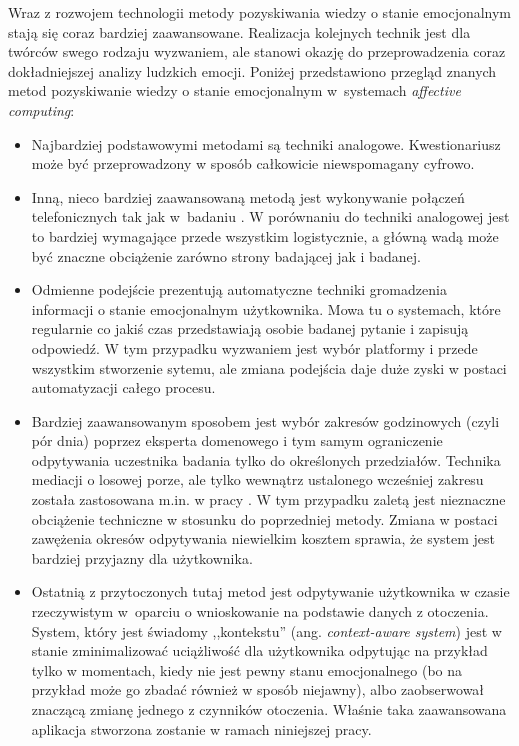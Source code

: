 Wraz z rozwojem technologii metody pozyskiwania wiedzy o stanie emocjonalnym stają się coraz bardziej zaawansowane. Realizacja kolejnych technik jest dla twórców swego rodzaju wyzwaniem, ale stanowi okazję do przeprowadzenia coraz dokładniejszej analizy ludzkich emocji. Poniżej przedstawiono przegląd znanych metod pozyskiwanie wiedzy o stanie emocjonalnym w~systemach \textit{affective computing}:

\begin{itemize}	
	\item Najbardziej podstawowymi metodami są techniki analogowe. Kwestionariusz może być przeprowadzony w sposób całkowicie niewspomagany cyfrowo.
	
	\item Inną, nieco bardziej zaawansowaną metodą jest wykonywanie połączeń telefonicznych tak jak w~badaniu \cite{courvoisier2010psychometric}. W porównaniu do techniki analogowej jest to bardziej wymagające przede wszystkim logistycznie, a główną wadą może być znaczne obciążenie zarówno strony badającej jak i badanej.
	
	\item Odmienne podejście prezentują automatyczne techniki gromadzenia informacji o stanie emocjonalnym użytkownika. Mowa tu o systemach, które regularnie co jakiś czas przedstawiają osobie badanej pytanie i zapisują odpowiedź. W tym przypadku wyzwaniem jest wybór platformy i przede wszystkim stworzenie sytemu, ale zmiana podejścia daje duże zyski w postaci automatyzacji całego procesu.
	
	\item Bardziej zaawansowanym sposobem jest wybór zakresów godzinowych (czyli pór dnia) poprzez eksperta domenowego i tym samym ograniczenie odpytywania uczestnika badania tylko do określonych przedziałów. Technika mediacji o losowej porze, ale tylko wewnątrz ustalonego wcześniej zakresu została zastosowana m.in. w pracy \cite{bailon2019smartphone}. W tym przypadku zaletą jest nieznaczne obciążenie techniczne w stosunku do poprzedniej metody. Zmiana w postaci zawężenia okresów odpytywania niewielkim kosztem sprawia, że system jest bardziej przyjazny dla użytkownika.
	
	\item Ostatnią z przytoczonych tutaj metod jest odpytywanie użytkownika w czasie rzeczywistym w~oparciu o wnioskowanie na podstawie danych z otoczenia. System, który jest świadomy ,,kontekstu'' (ang. \textit{context-aware system}) jest w stanie zminimalizować uciążliwość dla użytkownika odpytując na przykład tylko w momentach, kiedy nie jest pewny stanu emocjonalnego (bo na przykład może go zbadać również w sposób niejawny), albo zaobserwował znaczącą zmianę jednego z czynników otoczenia. Właśnie taka zaawansowana aplikacja stworzona zostanie w ramach niniejszej pracy.
\end{itemize}
	
